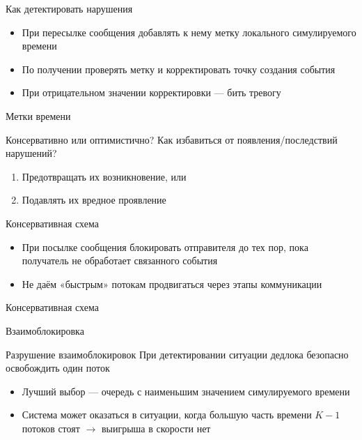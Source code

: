 \documentclass{beamer}
\begin{document}
\begin{frame}{Как детектировать нарушения}

\begin{itemize}
\item При пересылке сообщения добавлять к нему метку локального симулируемого времени
\item По получении проверять метку и корректировать точку создания события
\item При отрицательном значении корректировки — бить тревогу
\end{itemize}

\end{frame}

\begin{frame}{Метки времени}
\centering

\end{frame}

\begin{frame}{Консервативно или оптимистично?}
Как избавиться от появления/последствий нарушений?

\begin{enumerate}
    \item Предотвращать их возникновение, или
    \item Подавлять их вредное проявление
\end{enumerate}

\end{frame}

\begin{frame}{Консервативная схема}
\begin{itemize}
    \item При посылке сообщения блокировать отправителя до тех пор, пока получатель не обработает связанного события
    \item Не даём «быстрым» потокам продвигаться через этапы коммуникации
\end{itemize}
\end{frame}

\begin{frame}{Консервативная схема}
\centering
    
\end{frame}

\begin{frame}{Взаимоблокировка}
\centering


\end{frame}

\begin{frame}{Разрушение взаимоблокировок}
При детектировании ситуации дедлока безопасно освобождить один поток

\begin{itemize}
\item Лучший выбор — очередь с наименьшим значением симулируемого времени
\item Система может оказаться в ситуации, когда большую часть времени $K-1$ потоков стоят $\rightarrow$ выигрыша в скорости нет
\end{itemize}

\end{frame}
\end{document}
